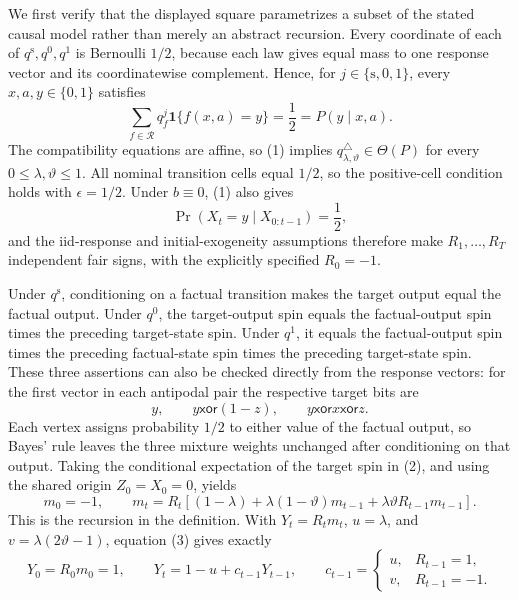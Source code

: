 We first verify that the displayed square parametrizes a subset of the stated causal model rather than merely an abstract recursion.  Every coordinate of each of \(q^{\mathrm s},q^0,q^1\) is Bernoulli \(1/2\), because each law gives equal mass to one response vector and its coordinatewise complement.  Hence, for \(j\in\{\mathrm s,0,1\}\), every \(x,a,y\in\{0,1\}\) satisfies
\[
 \sum_{f\in\mathcal R}q^j_f\mathbf 1\{f(x,a)=y\}=\frac12=P(y\mid x,a).
 \tag{1}
\]
The compatibility equations are affine, so (1) implies \(q^{\triangle}_{\lambda,\vartheta}\in\Theta(P)\) for every \(0\leq\lambda,\vartheta\leq1\).  All nominal transition cells equal \(1/2\), so the positive-cell condition holds with \(\epsilon=1/2\).  Under \(b\equiv0\), (1) also gives
\[
 \Pr(X_t=y\mid X_{0:t-1})=\frac12,
\]
and the iid-response and initial-exogeneity assumptions therefore make \(R_1,\ldots,R_T\) independent fair signs, with the explicitly specified \(R_0=-1\).

Under \(q^{\mathrm s}\), conditioning on a factual transition makes the target output equal the factual output.  Under \(q^0\), the target-output spin equals the factual-output spin times the preceding target-state spin.  Under \(q^1\), it equals the factual-output spin times the preceding factual-state spin times the preceding target-state spin.  These three assertions can also be checked directly from the response vectors: for the first vector in each antipodal pair the respective target bits are
\[
 y,\qquad y\mathbin{\mathsf{xor}}(1-z),\qquad
 y\mathbin{\mathsf{xor}}x\mathbin{\mathsf{xor}}z.
 \tag{2}
\]
Each vertex assigns probability \(1/2\) to either value of the factual output, so Bayes' rule leaves the three mixture weights unchanged after conditioning on that output.  Taking the conditional expectation of the target spin in (2), and using the shared origin \(Z_0=X_0=0\), yields
\[
 m_0=-1,\qquad
 m_t=R_t\left[(1-\lambda)+\lambda(1-\vartheta)m_{t-1}
                 +\lambda\vartheta R_{t-1}m_{t-1}\right].
 \tag{3}
\]
This is the recursion in the definition.  With \(Y_t=R_tm_t\), \(u=\lambda\), and \(v=\lambda(2\vartheta-1)\), equation (3) gives exactly
\[
 Y_0=R_0m_0=1,\qquad
 Y_t=1-u+c_{t-1}Y_{t-1},\qquad
 c_{t-1}=\begin{cases}u,&R_{t-1}=1,\\v,&R_{t-1}=-1.\end{cases}
 \tag{4}
\]

